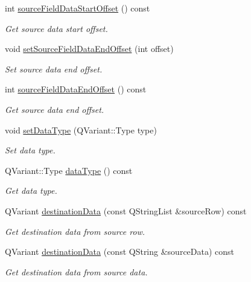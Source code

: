 \begin{DoxyCompactItemize}
int \hyperlink{classmdt_field_map_item_a03e8193593c5296056896cacc1511b35}{source\-Field\-Data\-Start\-Offset} () const 
\begin{DoxyCompactList}\small\item\em Get source data start offset. \end{DoxyCompactList}\item 
void \hyperlink{classmdt_field_map_item_a1f3ce5708a258078d8a8ced713bc99f8}{set\-Source\-Field\-Data\-End\-Offset} (int offset)
\begin{DoxyCompactList}\small\item\em Set source data end offset. \end{DoxyCompactList}\item 
int \hyperlink{classmdt_field_map_item_a71d1c69b8bc027f0af52275e5ad16248}{source\-Field\-Data\-End\-Offset} () const 
\begin{DoxyCompactList}\small\item\em Get source data end offset. \end{DoxyCompactList}\item 
void \hyperlink{classmdt_field_map_item_a38126faa3f0bbdddadaa79c95b26d42c}{set\-Data\-Type} (Q\-Variant\-::\-Type type)
\begin{DoxyCompactList}\small\item\em Set data type. \end{DoxyCompactList}\item 
Q\-Variant\-::\-Type \hyperlink{classmdt_field_map_item_a99e7d2031b825c6258340e28429c6d7d}{data\-Type} () const 
\begin{DoxyCompactList}\small\item\em Get data type. \end{DoxyCompactList}\item 
Q\-Variant \hyperlink{classmdt_field_map_item_a7a9e05642484dabc844cbbf1bf1b01ee}{destination\-Data} (const Q\-String\-List \&source\-Row) const 
\begin{DoxyCompactList}\small\item\em Get destination data from source row. \end{DoxyCompactList}\item 
Q\-Variant \hyperlink{classmdt_field_map_item_a8572c7132417ffce29a31d4c2efe7741}{destination\-Data} (const Q\-String \&source\-Data) const 
\begin{DoxyCompactList}\small\item\em Get destination data from source data. \end{DoxyCompactList}\end{DoxyCompactItemize}


